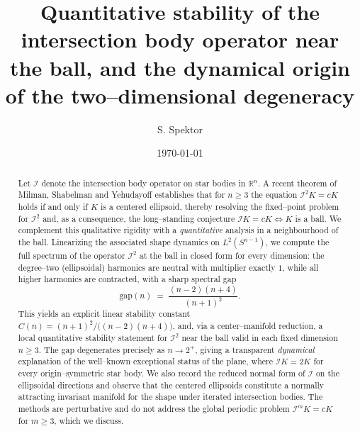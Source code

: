 \documentclass[11pt,reqno]{amsart}
\theoremstyle{plain}
\theoremstyle{definition}
\newcommand{\R}{\mathbb{R}}
\newcommand{\Sph}{S^{n-1}}
\newcommand{\IB}{\mathcal{I}}
\begin{document}
\title[Quantitative stability of the intersection body operator near the ball]
{Quantitative stability of the intersection body operator near the ball,
and the dynamical origin of the two--dimensional degeneracy}

\author[S.~Spektor]{S. Spektor}
\address{S.~Spektor\\ School of Data, Computing and Mathematics,
Canisius University, 2001 Main Street, Buffalo, NY, 14208-1098}

\date{\today}



\begin{abstract}
Let $\IB$ denote the intersection body operator on star bodies in $\R^n$.
A recent theorem of Milman, Shabelman and Yehudayoff establishes that for
$n\ge 3$ the equation $\IB^2 K = cK$ holds if and only if $K$ is a centered
ellipsoid, thereby resolving the fixed--point problem for $\IB^2$ and, as a
consequence, the long--standing conjecture $\IB K = cK \Leftrightarrow K$
is a ball. We complement this qualitative rigidity with a \emph{quantitative}
analysis in a neighbourhood of the ball. Linearizing the associated
shape dynamics on $L^2(\Sph)$, we compute the full spectrum of the
operator $\IB^2$ at the ball in closed form for every dimension: the
degree--two (ellipsoidal) harmonics are neutral with multiplier exactly
$1$, while all higher harmonics are contracted, with a sharp spectral gap
\[
   \mathrm{gap}(n)\;=\;\frac{(n-2)(n+4)}{(n+1)^2}.
\]
This yields an explicit linear stability constant
$C(n)=(n+1)^2/\big((n-2)(n+4)\big)$, and, via a center--manifold reduction,
a local quantitative stability statement for $\IB^2$ near the ball valid in
each fixed dimension $n\ge 3$. The gap degenerates precisely as $n\to 2^+$,
giving a transparent \emph{dynamical} explanation of the well--known
exceptional status of the plane, where $\IB K = 2K$ for every origin--symmetric
star body. We also record the reduced normal form of $\IB$ on the ellipsoidal
directions and observe that the centered ellipsoids constitute a normally
attracting invariant manifold for the shape under iterated intersection
bodies. The methods are perturbative and do not address the global periodic
problem $\IB^m K = cK$ for $m\ge 3$, which we discuss.
\end{abstract}
\end{document}
